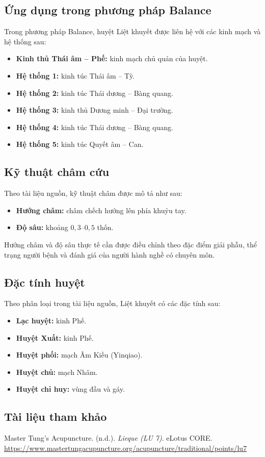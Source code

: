 \subsection{Ứng dụng trong phương pháp Balance}

Trong phương pháp Balance, huyệt Liệt khuyết được liên hệ với các kinh mạch và hệ thống sau:

\begin{itemize}
    \item \textbf{Kinh thủ Thái âm -- Phế:} kinh mạch chủ quản của huyệt.
    \item \textbf{Hệ thống 1:} kinh túc Thái âm -- Tỳ.
    \item \textbf{Hệ thống 2:} kinh túc Thái dương -- Bàng quang.
    \item \textbf{Hệ thống 3:} kinh thủ Dương minh -- Đại trường.
    \item \textbf{Hệ thống 4:} kinh túc Thái dương -- Bàng quang.
    \item \textbf{Hệ thống 5:} kinh túc Quyết âm -- Can.
\end{itemize}

\subsection{Kỹ thuật châm cứu}

Theo tài liệu nguồn, kỹ thuật châm được mô tả như sau:

\begin{itemize}
    \item \textbf{Hướng châm:} châm chếch hướng lên phía khuỷu tay.
    \item \textbf{Độ sâu:} khoảng \(0{,}3\)--\(0{,}5\) thốn.
\end{itemize}

Hướng châm và độ sâu thực tế cần được điều chỉnh theo đặc điểm giải phẫu, thể trạng người bệnh và đánh giá của người hành nghề có chuyên môn.

\subsection{Đặc tính huyệt}

Theo phân loại trong tài liệu nguồn, Liệt khuyết có các đặc tính sau:

\begin{itemize}
    \item \textbf{Lạc huyệt:} kinh Phế.
    \item \textbf{Huyệt Xuất:} kinh Phế.
    \item \textbf{Huyệt phối:} mạch Âm Kiều (Yinqiao).
    \item \textbf{Huyệt chủ:} mạch Nhâm.
    \item \textbf{Huyệt chỉ huy:} vùng đầu và gáy.
\end{itemize}

\subsection{Tài liệu tham khảo}

Master Tung's Acupuncture. (n.d.). \textit{Lieque (LU 7)}.
eLotus CORE.
\url{https://www.mastertungacupuncture.org/acupuncture/traditional/points/lu7}